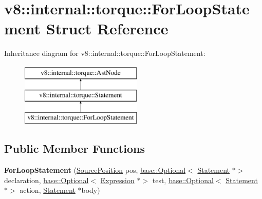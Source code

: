 \hypertarget{structv8_1_1internal_1_1torque_1_1ForLoopStatement}{}\section{v8\+:\+:internal\+:\+:torque\+:\+:For\+Loop\+Statement Struct Reference}
\label{structv8_1_1internal_1_1torque_1_1ForLoopStatement}
Inheritance diagram for v8\+:\+:internal\+:\+:torque\+:\+:For\+Loop\+Statement\+:\begin{figure}[H]
\begin{center}
\leavevmode
\includegraphics[height=3.000000cm]{structv8_1_1internal_1_1torque_1_1ForLoopStatement}
\end{center}
\end{figure}
\subsection*{Public Member Functions}
\begin{DoxyCompactItemize}
\item 
\mbox{\label{structv8_1_1internal_1_1torque_1_1ForLoopStatement_a429541f022331036573b1769e09cbad9}} 
{\bfseries For\+Loop\+Statement} (\mbox{\hyperlink{structv8_1_1internal_1_1torque_1_1SourcePosition}{Source\+Position}} pos, \mbox{\hyperlink{classv8_1_1base_1_1Optional}{base\+::\+Optional}}$<$ \mbox{\hyperlink{structv8_1_1internal_1_1torque_1_1Statement}{Statement}} $\ast$$>$ declaration, \mbox{\hyperlink{classv8_1_1base_1_1Optional}{base\+::\+Optional}}$<$ \mbox{\hyperlink{structv8_1_1internal_1_1torque_1_1Expression}{Expression}} $\ast$$>$ test, \mbox{\hyperlink{classv8_1_1base_1_1Optional}{base\+::\+Optional}}$<$ \mbox{\hyperlink{structv8_1_1internal_1_1torque_1_1Statement}{Statement}} $\ast$$>$ action, \mbox{\hyperlink{structv8_1_1internal_1_1torque_1_1Statement}{Statement}} $\ast$body)
\end{DoxyCompactItemize}
